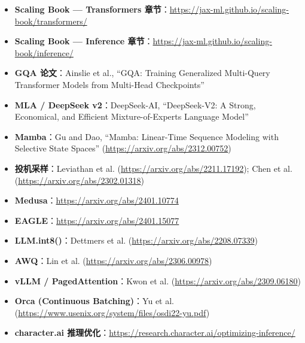 \begin{itemize}
    \item \textbf{Scaling Book --- Transformers 章节}：\url{https://jax-ml.github.io/scaling-book/transformers/}
    \item \textbf{Scaling Book --- Inference 章节}：\url{https://jax-ml.github.io/scaling-book/inference/}
    \item \textbf{GQA 论文}：Ainslie et al., ``GQA: Training Generalized Multi-Query Transformer Models from Multi-Head Checkpoints''
    \item \textbf{MLA / DeepSeek v2}：DeepSeek-AI, ``DeepSeek-V2: A Strong, Economical, and Efficient Mixture-of-Experts Language Model''
    \item \textbf{Mamba}：Gu and Dao, ``Mamba: Linear-Time Sequence Modeling with Selective State Spaces'' (\url{https://arxiv.org/abs/2312.00752})
    \item \textbf{投机采样}：Leviathan et al. (\url{https://arxiv.org/abs/2211.17192}); Chen et al. (\url{https://arxiv.org/abs/2302.01318})
    \item \textbf{Medusa}：\url{https://arxiv.org/abs/2401.10774}
    \item \textbf{EAGLE}：\url{https://arxiv.org/abs/2401.15077}
    \item \textbf{LLM.int8()}：Dettmers et al. (\url{https://arxiv.org/abs/2208.07339})
    \item \textbf{AWQ}：Lin et al. (\url{https://arxiv.org/abs/2306.00978})
    \item \textbf{vLLM / PagedAttention}：Kwon et al. (\url{https://arxiv.org/abs/2309.06180})
    \item \textbf{Orca (Continuous Batching)}：Yu et al. (\url{https://www.usenix.org/system/files/osdi22-yu.pdf})
    \item \textbf{character.ai 推理优化}：\url{https://research.character.ai/optimizing-inference/}
\end{itemize}


